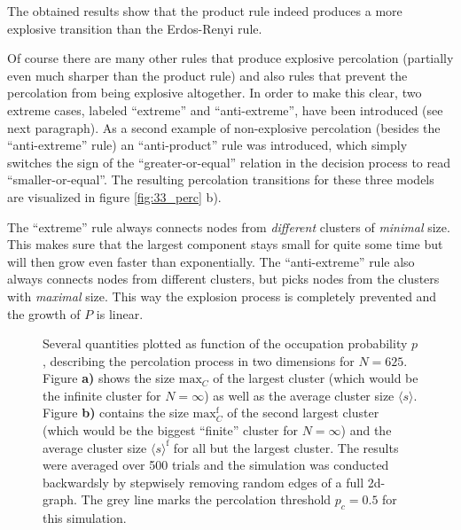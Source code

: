 \documentclass{scrartcl}
\begin{document}
The obtained results show that the product rule indeed produces a more
explosive transition than the Erdos-Renyi rule.

 Of course there are many other rules that produce
explosive percolation (partially even much sharper than the product rule)
and also rules that prevent the percolation from being explosive
altogether. In order to make this clear, two extreme cases, labeled
\enquote{extreme} and \enquote{anti-extreme}, have been introduced (see
next paragraph).  As a second example of non-explosive percolation (besides
the \enquote{anti-extreme} rule) an \enquote{anti-product} rule was
introduced, which simply switches the sign of the
\enquote{greater-or-equal} relation in the decision process to read
\enquote{smaller-or-equal}. The resulting percolation transitions for these
three models are visualized in figure \ref{fig:33_perc} b).

The \enquote{extreme} rule always connects nodes from \emph{different}
clusters of \emph{minimal} size. This makes sure that the largest component
stays small for quite some time but will then grow even faster than
exponentially. 
The \enquote{anti-extreme} rule also always connects nodes from different clusters,
but picks nodes from the clusters with \emph{maximal} size. This way the explosion process
is completely prevented and the growth of $P$ is linear.

\begin{figure}
    \caption{Several quantities plotted as function of the occupation probability
        $p$, describing the percolation process in two dimensions for
        $N=625$. Figure \textbf{a)} shows the size $\mathrm{max}_C$ of the
        largest cluster (which would be the infinite cluster for $N
        = \infty$) as well as the average cluster size $\langle s\rangle$.
        Figure \textbf{b)} contains the size $\mathrm{max}_C^\mathrm{f}$ of
        the second largest cluster (which would be the biggest
        \enquote{finite} cluster for $N=\infty$) and the average cluster
        size $\langle s\rangle^\mathrm{f}$ for all but the largest cluster.
        The results were averaged over 500 trials and the simulation was
        conducted backwardsly by stepwisely removing random edges of a full
        2d-graph. The grey line marks the percolation threshold $p_c=0.5$ for
        this simulation.}
    \label{fig:31_2d}
\end{figure}
\end{document}
